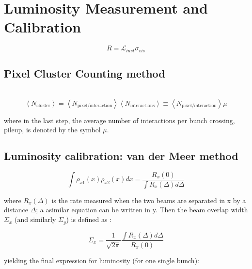 \chapter{Luminosity  Measurement and Calibration}
\label{ch3}



\begin{equation}
R=\mathcal{L}_{inst}\sigma_{vis}
\label{lumi_exp_gen}
\end{equation}



\section{Pixel Cluster Counting method}
 \\


\begin{equation}
\left < N_{\text{cluster}} \right > = \left < N_{\text{pixel}/\text{interaction}} \right >  \left < N_{\text{interactions}} \right > \equiv \left < N_{\text{pixel}/\text{interaction}} \right > \mu
\end{equation}

where in the last step, the average number of interactions per bunch crossing, pileup, is denoted by the symbol $\mu$.


\section{Luminosity calibration: van der Meer method}


\begin{equation}
\int \rho_{x1}(x) \rho_{x2}(x) dx = \frac{R_{x}(0)}{\int R_{x}(\Delta) d\Delta}
\end{equation}

where $R_{x}(\Delta)$ is the rate measured when the two beams are separated in x by a distance $\Delta$; a asimilar equation can be written in y. Then the beam overlap width $\Sigma_{x}$ (and similarly $\Sigma_{y}$) is defined as \cite{pas_18}:

\begin{equation}
\Sigma_{x}= \frac{1}{\sqrt{2\pi}} \frac{\int R_{x}(\Delta)d\Delta}{R_{x}(0)}
\end{equation}

yielding the final expression for luminosity (for one single bunch):

